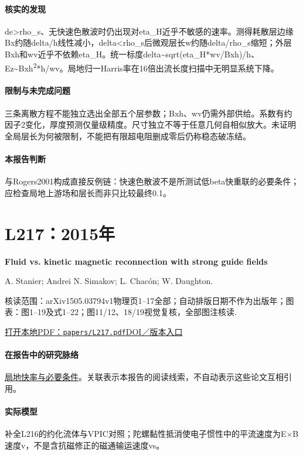 \documentclass[UTF8,a4paper,11pt,openany,fontset=fandol]{ctexbook}
\begin{document}
\paragraph{核实的发现}de>rho\_s、无快速色散波时仍出现对eta\_H近乎不敏感的速率。测得耗散层边缘Bx约随delta/h线性减小，delta<rho\_s后微观层长w约随delta/rho\_s缩短；外层Bxh和wv近乎不依赖eta\_H。统一标度delta\textasciitilde{}sqrt(eta\_H*wv/Bxh)/h、Ez\textasciitilde{}Bxh\textsuperscript{2}*h/wv。局地归一Harris率在16倍出流长度扫描中无明显系统下降。

\paragraph{限制与未完成问题}三条离散方程不能独立选出全部五个层参数；Bxh、wv仍需外部供给。系数有约因子2变化，厚度预测仅量级精度。尺寸独立不等于任意几何自相似放大。未证明全局层长为何被限制，不能把有限超电阻删成零后仍称稳态破冻结。

\paragraph{本报告判断}与Rogers2001构成直接反例链：快速色散波不是所测试低beta快重联的必要条件；应检查局地上游场和层长而非只比较最终0.1。

\section{L217：2015年}\label{paper:L217}

\textbf{Fluid vs. kinetic magnetic reconnection with strong guide fields}\citep{L217}\

A. Stanier;  Andrei N. Simakov;  L. Chacón;  W. Daughton.

\textsf{核读范围：}arXiv1505.03794v1物理页1–17全部；自动排版日期不作为出版年；\textsf{图表：}图1–19及式1–22；图11/12、18/19视觉复核，全部图注核读.

\href{run:../papers/L217.pdf}{打开本地PDF：\texttt{papers/L217.pdf}}\quad\href{https://doi.org/10.1063/1.4932330}{DOI／版本入口}

\paragraph{在报告中的研究脉络}\hyperref[story:fast]{局地快率与必要条件}。关联表示本报告的阅读线索，不自动表示这些论文互相引用。

\paragraph{实际模型}补全L216的约化流体与VPIC对照；陀螺黏性抵消使电子惯性中的平流速度为E×B速度v，不是含抗磁修正的磁通输运速度vs。
\end{document}
